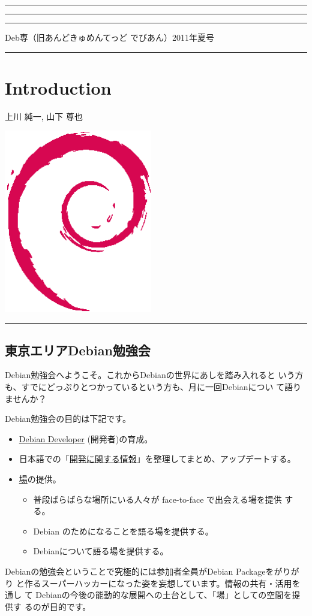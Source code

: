 \documentclass[mingoth,a4paper]{jsarticle}
\renewcommand{\dancersection}[2]{%
\newpage
Deb専（旧あんどきゅめんてっど でびあん）2011年夏号
%
\vspace{0.1mm}\\
{\color{dancerdarkblue}\rule{\hsize}{2mm}}

%
%
\begin{minipage}[t]{0.6\hsize}
\color{dancerdarkblue}
\vspace{1cm}
\section{#1}
\hfill{}#2\\
\end{minipage}
\begin{minipage}[t]{0.4\hsize}
\vspace{-2cm}
\hfill{}\includegraphics[height=8cm]{image200502/openlogo-nd.eps}\\
\vspace{-5cm}
\end{minipage}
%
{\color{dancerlightblue}\rule{0.66\hsize}{2mm}}
%
\vspace{2cm}
}
\begin{document}
\newpage
\thispagestyle{empty}\mbox{}
\newpage

\setcounter{page}{1}
\begin{minipage}[]{0.2\hsize}
 \colorbox{dancerlightblue}{}
\end{minipage}
\begin{minipage}[]{0.8\hsize}
\hrule
\vspace{1mm}
\hrule
\setcounter{tocdepth}{1}
{\small
 \tableofcontents}
\vspace{1mm}
\hrule
\vspace{3cm}

\end{minipage}

\dancersection{Introduction}{上川 純一, 山下 尊也}

\subsection{東京エリアDebian勉強会}

 Debian勉強会へようこそ。これからDebianの世界にあしを踏み入れると
 いう方も、すでにどっぷりとつかっているという方も、月に一回Debianについ
 て語りませんか？

 Debian勉強会の目的は下記です。

\begin{itemize}
 \item \underline{Debian Developer} (開発者)の育成。
 \item 日本語での「\underline{開発に関する情報}」を整理してまとめ、アップデートする。
 \item \underline{場}の提供。
 \begin{itemize}
  \item 普段ばらばらな場所にいる人々が face-to-face で出会える場を提供
	する。
  \item Debian のためになることを語る場を提供する。
  \item Debianについて語る場を提供する。
 \end{itemize}
\end{itemize}

 Debianの勉強会ということで究極的には参加者全員がDebian Packageをがりがり
 と作るスーパーハッカーになった姿を妄想しています。情報の共有・活用を通し
 て Debianの今後の能動的な展開への土台として、「場」としての空間を提供す
 るのが目的です。
\end{document}
